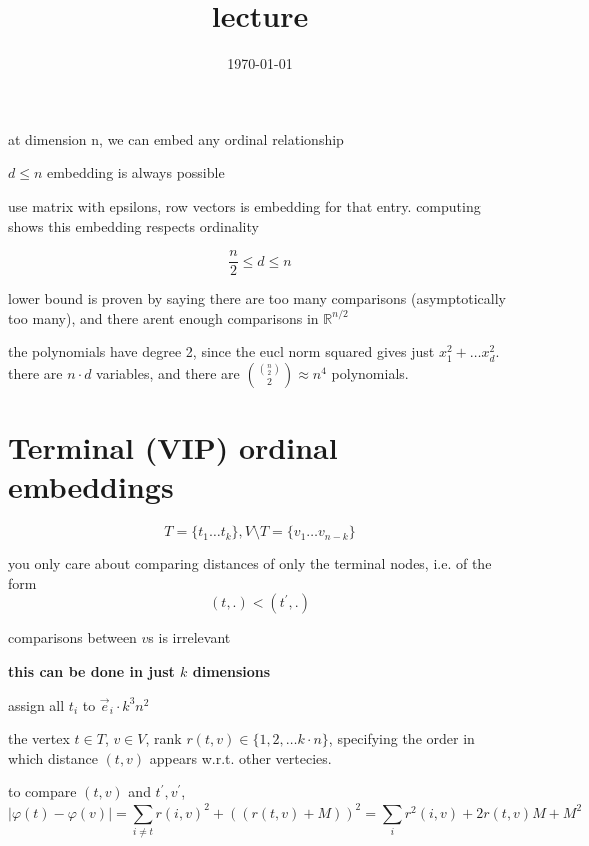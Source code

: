 \documentclass{article}
\title{lecture}
\date{\today}
\theoremstyle{definition}
\newcommand{\abs}[1]{\left| #1 \right|}
\begin{document}
\maketitle

at dimension n, we can embed any ordinal relationship

\(d\leq n\) embedding is always possible

use matrix with epsilons, row vectors is embedding for that entry. computing shows this embedding respects ordinality

\begin{equation}
    \frac{n}{2}\leq d \leq n
\end{equation}


lower bound is proven by saying there are too many comparisons (asymptotically too many), and there arent enough comparisons in \(\mathbb R^{n/2}\)


the polynomials have degree 2, since the eucl norm squared gives just \(x_1^2+\dots x_d^2\). there are \(n\cdot d\) variables, and there are \({{n \choose 2}\choose 2 }\approx n^4\) polynomials.


\section{Terminal (VIP) ordinal embeddings}

\begin{equation}
    T=\{t_1\dots t_k\}, V\setminus T = \{v_1\dots v_{n-k}\}
\end{equation}

you only care about comparing distances of only the terminal nodes, i.e. of the form
\begin{equation}
    (t,.)<(t^\prime,.)
\end{equation}

comparisons between \(v\)s is irrelevant


\textbf{this can be done in just \(k\) dimensions}


assign all \(t_i\) to \(\vec e_i \cdot k^3n^2\)

the vertex \(t\in T\), \(v\in V\), rank \(r(t,v)\in \{1,2,\dots k\cdot n\}\), specifying the order in which distance \((t,v)\) appears w.r.t. other vertecies. 

to compare \((t,v)\) and \(t^\prime, v^\prime\), 
\begin{equation}
    \abs{\varphi(t)-\varphi(v)}= \sum_{i\neq t}^{}r(i,v)^2 + \left( (r(t,v)+M) \right)^2 = \sum_{i}^{}r^2(i,v)+2r(t,v)M+M^2
\end{equation}
\end{document}
